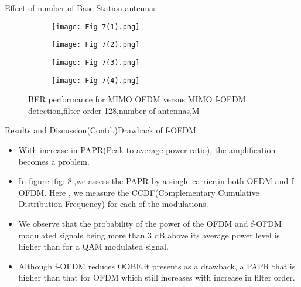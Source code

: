 \documentclass{beamer}
\begin{document}
\begin{frame}{Effect of number of Base Station antennas }
    \begin{figure}
        \centering
        \begin{subfigure}[b]{0.23\textwidth}
         \centering
         \texttt{[image: Fig 7(1).png]}
         \caption{}
         \label{fig:7(1)}
        \end{subfigure}
        \hfill
        \begin{subfigure}[b]{0.23\textwidth}
         \centering
         \texttt{[image: Fig 7(2).png]}
         \caption{}
         \label{fig:7(2)}
        \end{subfigure}
        \hfill
        \centering
        \begin{subfigure}[b]{0.23\textwidth}
         \centering
         \texttt{[image: Fig 7(3).png]}
         \caption{}
         \label{fig:7(3)}
        \end{subfigure}
        \hfill
        \centering
        \begin{subfigure}[b]{0.23\textwidth}
         \centering
         \texttt{[image: Fig 7(4).png]}
         \caption{}
         \label{fig:7(4)}
        \end{subfigure}
        \caption{BER performance for MIMO OFDM versus MIMO f-OFDM detection,filter order 128,number of antennas,M}
        \label{fig: 7}
    \end{figure}
\end{frame}
\begin{frame}{Results and Discussion(Contd.)}{Drawback of f-OFDM}
    \begin{itemize}
    \item With increase in PAPR(Peak to average power ratio), the amplification becomes a problem.
    \item In figure \ref{fig: 8},we assess the PAPR by a single carrier,in both OFDM and f-OFDM. Here , we measure the CCDF(Complementary Cumulative Distribution Frequency) for each of the modulations.
    \item We observe that the probability of the power of the OFDM and f-OFDM modulated signals being more than 3 dB above its average power level is higher than for a QAM modulated signal.
    \item Although f-OFDM reduces OOBE,it presents as a drawback, a PAPR that is higher than that for OFDM which still increases with increase in filter order.
    \end{itemize}
\end{frame}
\end{document}
